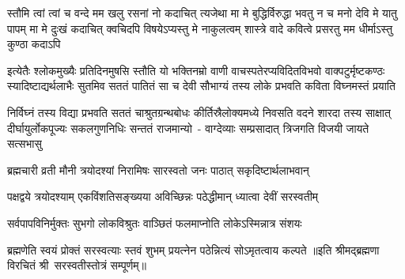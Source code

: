 \fourlineindentedshloka
{स्तौमि त्वां त्वां च वन्दे मम खलु रसनां नो कदाचित् त्यजेथा}
{मा मे बुद्धिर्विरुद्धा भवतु न च मनो देवि मे यातु पापम्}
{मा मे दुःखं कदाचित् क्वचिदपि विषयेऽप्यस्तु मे नाकुलत्वम्}
{शास्त्रे वादे कवित्वे प्रसरतु मम धीर्माऽस्तु कुण्ठा कदाऽपि}

\fourlineindentedshloka
{इत्येतैः श्लोकमुख्यैः प्रतिदिनमुषसि स्तौति यो भक्तिनम्रो}
{वाणी वाचस्पतेरप्यविदितविभवो वाक्पटुर्मृष्टकण्ठः}
{स्यादिष्टाद्यर्थलाभैः सुतमिव सततं पातितं सा च देवी}
{सौभाग्यं तस्य लोके प्रभवति कविता विघ्नमस्तं प्रयाति}

\fourlineindentedshloka
{निर्विघ्नं तस्य विद्या प्रभवति सततं चाश्रुतग्रन्थबोधः}
{कीर्तिस्रैलोक्यमध्ये निवसति वदने शारदा तस्य साक्षात्}
{दीर्घायुर्लोकपूज्यः सकलगुणनिधिः सन्ततं राजमान्यो~-}
{वाग्देव्याः सम्प्रसादात् त्रिजगति विजयी जायते सत्सभासु}

\twolineshloka
{ब्रह्मचारी व्रती मौनी त्रयोदश्यां निरामिषः}
{सारस्वतो जनः पाठात् सकृदिष्टार्थलाभवान्}

\twolineshloka
{पक्षद्वये त्रयोदश्याम् एकविंशतिसङ्ख्यया}
{अविच्छिन्नः पठेद्धीमान् ध्यात्वा देवीं सरस्वतीम्}

\twolineshloka
{सर्वपापविनिर्मुक्तः सुभगो लोकविश्रुतः}
{वाञ्छितं फलमाप्नोति लोकेऽस्मिन्नात्र संशयः}

\twolineshloka
{ब्रह्मणेति स्वयं प्रोक्तं सरस्वत्याः स्तवं शुभम्}
{प्रयत्नेन पठेन्नित्यं सोऽमृतत्वाय कल्पते}
॥इति श्रीमद्ब्रह्मणा विरचितं श्री~सरस्वतीस्तोत्रं सम्पूर्णम्॥
\setlength{\shlokaspaceskip}{24pt}